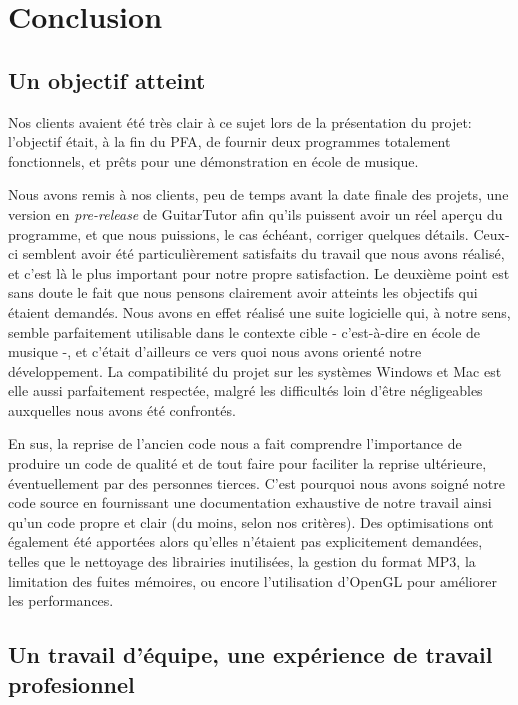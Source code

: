 \section*{Conclusion}

\subsection*{Un objectif atteint}

Nos clients avaient été très clair à ce sujet lors de la présentation du projet: l'objectif était, à la fin du PFA, de fournir deux programmes totalement fonctionnels, et prêts pour une démonstration en école de musique.

Nous avons remis à nos clients, peu de temps avant la date finale des projets, une version en \textit{pre-release} de GuitarTutor afin qu'ils puissent avoir un réel aperçu du programme, et que nous puissions, le cas échéant, corriger quelques détails. Ceux-ci semblent avoir été particulièrement satisfaits du travail que nous avons réalisé, et c'est là le plus important pour notre propre satisfaction. Le deuxième point est sans doute le fait que nous pensons clairement avoir atteints les objectifs qui étaient demandés. Nous avons en effet réalisé une suite logicielle qui, à notre sens, semble parfaitement utilisable dans le contexte cible - c'est-à-dire en école de musique -, et c'était d'ailleurs ce vers quoi nous avons orienté notre développement. La compatibilité du projet sur les systèmes Windows et Mac est elle aussi parfaitement respectée, malgré les difficultés loin d'être négligeables auxquelles nous avons été confrontés.

En sus, la reprise de l'ancien code nous a fait comprendre l'importance de produire un code de qualité et de tout faire pour faciliter la reprise ultérieure, éventuellement par des personnes tierces. C'est pourquoi nous avons soigné notre code source en fournissant une documentation exhaustive de notre travail ainsi qu'un code propre et clair (du moins, selon nos critères). Des optimisations ont également été apportées alors qu'elles n'étaient pas explicitement demandées, telles que le nettoyage des librairies inutilisées, la gestion du format MP3, la limitation des fuites mémoires, ou encore l'utilisation d'OpenGL pour améliorer les performances.

\subsection*{Un travail d'équipe, une expérience de travail profesionnel}

